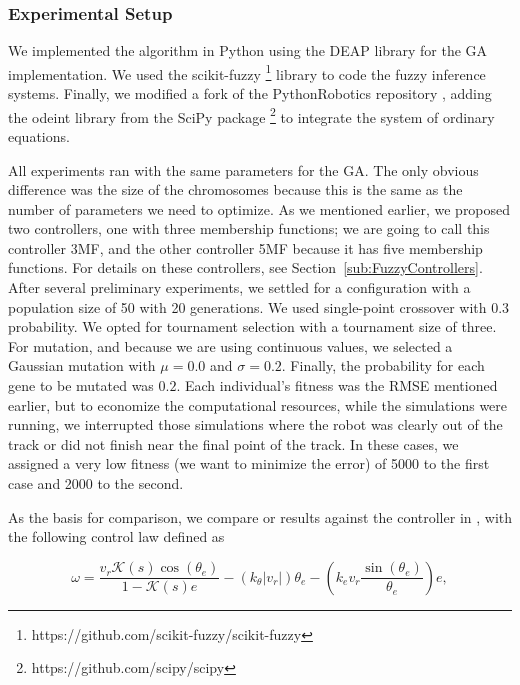 \documentclass[symmetry,article,submit,moreauthors,pdftex]{Definitions/mdpi}
\begin{document}

\subsubsection{Experimental Setup} %
\label{sub:setup}

We implemented the algorithm in Python using the DEAP \cite{fortin_deap_2012}
library for the GA implementation. We used the scikit-fuzzy
\footnote{https://github.com/scikit-fuzzy/scikit-fuzzy} library to code the
fuzzy inference  systems. Finally, we modified a fork of the PythonRobotics
repository \cite{sakai_pythonrobotics_2018}, adding the odeint library from the
SciPy package \footnote{https://github.com/scipy/scipy} to integrate the system
of ordinary equations.

All experiments ran with the same parameters for the GA. The only obvious
difference was the size of the chromosomes because this is the same as the
number of parameters we need to optimize. As we mentioned earlier, we proposed
two controllers, one with three membership functions; we are going to call this
controller 3MF, and the other controller 5MF because it has five membership
functions. For details on these controllers, see
Section~\ref{sub:FuzzyControllers}.  After several preliminary experiments, we
settled for a configuration with a population size of 50 with 20 generations.
We used single-point crossover with $0.3$ probability.  We opted for tournament
selection with a tournament size of three. For mutation, and because we are
using continuous values, we selected a Gaussian mutation with $\mu=0.0$ and
$\sigma=0.2$. Finally, the probability for each gene to be mutated was $0.2$.
Each individual's fitness was the RMSE mentioned earlier, but to economize the
computational resources, while the simulations were running, we interrupted
those simulations where the robot was clearly out of the track or did not
finish near the final point of the track. In these cases, we assigned a very
low fitness (we want to minimize the error) of 5000 to the first case and 2000
to the second.  

As the basis for comparison, we compare or results against the controller in
\cite{paden_survey_2016}, with the following control law defined as 

\begin{equation}\label{eq:controller}
\omega = \frac{v_r \mathcal{K}(s) \cos(\theta_e)}{1 - \mathcal{K}(s)e} -
  (k_{\theta}|v_r|)\theta_e - \left( k_ev_r \frac{\sin(\theta_e)}{\theta_e}\right) e,
\end{equation}
\end{document}
